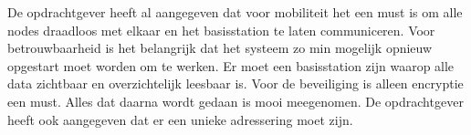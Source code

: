 De opdrachtgever heeft al aangegeven dat voor mobiliteit het een must is om alle nodes draadloos met elkaar en het basisstation te laten communiceren.
Voor betrouwbaarheid is het belangrijk dat het systeem zo min mogelijk opnieuw opgestart moet worden om te werken.
Er moet een basisstation zijn waarop alle data zichtbaar en overzichtelijk leesbaar is. 
Voor de beveiliging is alleen encryptie een must. Alles dat daarna wordt gedaan is mooi meegenomen.
De opdrachtgever heeft ook aangegeven dat er een unieke adressering moet zijn.